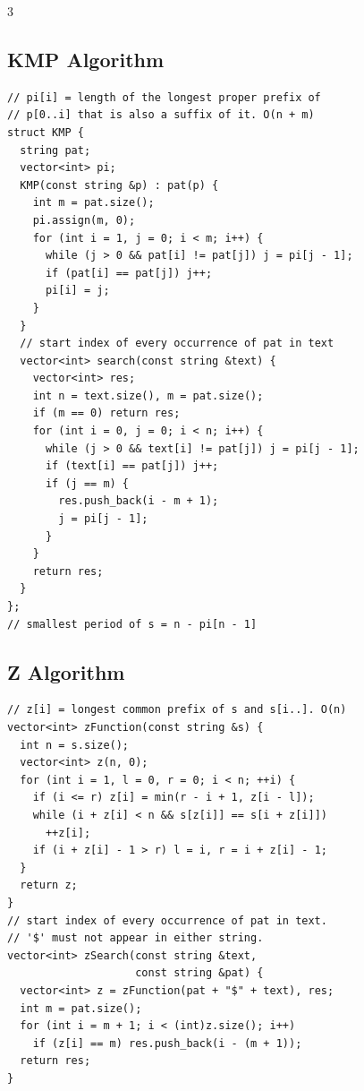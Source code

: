 \documentclass[8pt, a4paper]{article}
\begin{document}
\begin{multicols*}{3}
\subsection{KMP Algorithm}
\begin{lstlisting}
// pi[i] = length of the longest proper prefix of
// p[0..i] that is also a suffix of it. O(n + m)
struct KMP {
  string pat;
  vector<int> pi;
  KMP(const string &p) : pat(p) {
    int m = pat.size();
    pi.assign(m, 0);
    for (int i = 1, j = 0; i < m; i++) {
      while (j > 0 && pat[i] != pat[j]) j = pi[j - 1];
      if (pat[i] == pat[j]) j++;
      pi[i] = j;
    }
  }
  // start index of every occurrence of pat in text
  vector<int> search(const string &text) {
    vector<int> res;
    int n = text.size(), m = pat.size();
    if (m == 0) return res;
    for (int i = 0, j = 0; i < n; i++) {
      while (j > 0 && text[i] != pat[j]) j = pi[j - 1];
      if (text[i] == pat[j]) j++;
      if (j == m) {
        res.push_back(i - m + 1);
        j = pi[j - 1];
      }
    }
    return res;
  }
};
// smallest period of s = n - pi[n - 1]
\end{lstlisting}
\subsection{Z Algorithm}
\begin{lstlisting}
// z[i] = longest common prefix of s and s[i..]. O(n)
vector<int> zFunction(const string &s) {
  int n = s.size();
  vector<int> z(n, 0);
  for (int i = 1, l = 0, r = 0; i < n; ++i) {
    if (i <= r) z[i] = min(r - i + 1, z[i - l]);
    while (i + z[i] < n && s[z[i]] == s[i + z[i]])
      ++z[i];
    if (i + z[i] - 1 > r) l = i, r = i + z[i] - 1;
  }
  return z;
}
// start index of every occurrence of pat in text.
// '$' must not appear in either string.
vector<int> zSearch(const string &text,
                    const string &pat) {
  vector<int> z = zFunction(pat + "$" + text), res;
  int m = pat.size();
  for (int i = m + 1; i < (int)z.size(); i++)
    if (z[i] == m) res.push_back(i - (m + 1));
  return res;
}
\end{lstlisting}

\end{multicols*}
\end{document}
